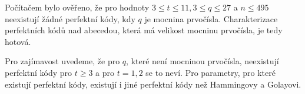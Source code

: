 Počítačem bylo ověřeno, že pro hodnoty $3 \leq t \leq 11, 3 \leq q \leq 27$ a $n \leq 495$ neexistují žádné perfektní kódy, kdy $q$ je mocnina prvočísla. Charakterizace perfektních kódů nad abecedou, která má velikost mocninu prvočísla, je tedy hotová.

Pro zajímavost uvedeme, že pro $q$, které není mocninou prvočísla, neexistují perfektní kódy pro $t \geq 3$ a pro $t = 1,2$ se to neví. Pro parametry, pro které existují perfektní kódy, existují i jiné perfektní kódy než Hammingovy a Golayovi.